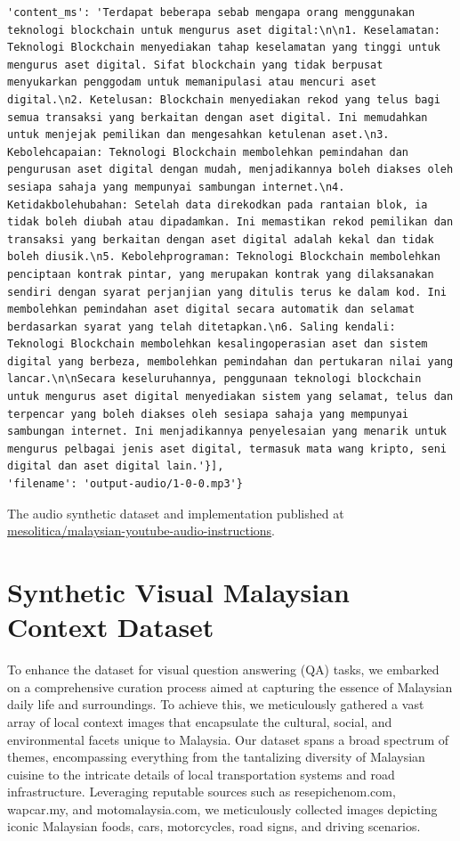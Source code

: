 \documentclass[preprint]{article}
\begin{document}
\begin{lstlisting}[breaklines=true]
  'content_ms': 'Terdapat beberapa sebab mengapa orang menggunakan teknologi blockchain untuk mengurus aset digital:\n\n1. Keselamatan: Teknologi Blockchain menyediakan tahap keselamatan yang tinggi untuk mengurus aset digital. Sifat blockchain yang tidak berpusat menyukarkan penggodam untuk memanipulasi atau mencuri aset digital.\n2. Ketelusan: Blockchain menyediakan rekod yang telus bagi semua transaksi yang berkaitan dengan aset digital. Ini memudahkan untuk menjejak pemilikan dan mengesahkan ketulenan aset.\n3. Kebolehcapaian: Teknologi Blockchain membolehkan pemindahan dan pengurusan aset digital dengan mudah, menjadikannya boleh diakses oleh sesiapa sahaja yang mempunyai sambungan internet.\n4. Ketidakbolehubahan: Setelah data direkodkan pada rantaian blok, ia tidak boleh diubah atau dipadamkan. Ini memastikan rekod pemilikan dan transaksi yang berkaitan dengan aset digital adalah kekal dan tidak boleh diusik.\n5. Kebolehprograman: Teknologi Blockchain membolehkan penciptaan kontrak pintar, yang merupakan kontrak yang dilaksanakan sendiri dengan syarat perjanjian yang ditulis terus ke dalam kod. Ini membolehkan pemindahan aset digital secara automatik dan selamat berdasarkan syarat yang telah ditetapkan.\n6. Saling kendali: Teknologi Blockchain membolehkan kesalingoperasian aset dan sistem digital yang berbeza, membolehkan pemindahan dan pertukaran nilai yang lancar.\n\nSecara keseluruhannya, penggunaan teknologi blockchain untuk mengurus aset digital menyediakan sistem yang selamat, telus dan terpencar yang boleh diakses oleh sesiapa sahaja yang mempunyai sambungan internet. Ini menjadikannya penyelesaian yang menarik untuk mengurus pelbagai jenis aset digital, termasuk mata wang kripto, seni digital dan aset digital lain.'}],
'filename': 'output-audio/1-0-0.mp3'}
\end{lstlisting}

The audio synthetic dataset and implementation published at \href{https://huggingface.co/datasets/mesolitica/malaysian-youtube-audio-instructions}{mesolitica/malaysian-youtube-audio-instructions}.

\section{Synthetic Visual Malaysian Context Dataset}

To enhance the dataset for visual question answering (QA) tasks, we embarked on a comprehensive curation process aimed at capturing the essence of Malaysian daily life and surroundings. To achieve this, we meticulously gathered a vast array of local context images that encapsulate the cultural, social, and environmental facets unique to Malaysia. Our dataset spans a broad spectrum of themes, encompassing everything from the tantalizing diversity of Malaysian cuisine to the intricate details of local transportation systems and road infrastructure. Leveraging reputable sources such as resepichenom.com, wapcar.my, and motomalaysia.com, we meticulously collected images depicting iconic Malaysian foods, cars, motorcycles, road signs, and driving scenarios.
\end{document}
